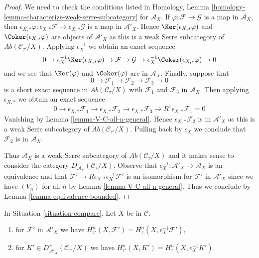 \begin{proof}
We need to check the conditions listed in
Homology, Lemma \ref{homology-lemma-characterize-weak-serre-subcategory}
for $\mathcal{A}_X$. If $\varphi : \mathcal{F} \to \mathcal{G}$ is a map
in $\mathcal{A}_X$, then $\epsilon_{X, *}\varphi :
\epsilon_{X, *}\mathcal{F} \to \epsilon_{X, *}\mathcal{G}$
is a map in $\mathcal{A}'_X$. Hence $\Ker(\epsilon_{X, *}\varphi)$ and
$\Coker(\epsilon_{X, *}\varphi)$ are objects of $\mathcal{A}'_X$
as this is a weak Serre subcategory of $\textit{Ab}(\mathcal{C}_{\tau'}/X)$.
Applying $\epsilon_X^{-1}$ we obtain an exact sequence
$$
0 \to
\epsilon_X^{-1}\Ker(\epsilon_{X, *}\varphi) \to
\mathcal{F} \to \mathcal{G} \to
\epsilon_X^{-1}\Coker(\epsilon_{X, *}\varphi) \to 0
$$
and we see that $\Ker(\varphi)$ and $\Coker(\varphi)$ are in
$\mathcal{A}_X$. Finally, suppose that
$$
0 \to \mathcal{F}_1 \to \mathcal{F}_2 \to \mathcal{F}_3 \to 0
$$
is a short exact sequence in $\textit{Ab}(\mathcal{C}_\tau/X)$
with $\mathcal{F}_1$ and $\mathcal{F}_3$ in $\mathcal{A}_X$.
Then applying $\epsilon_{X, *}$ we obtain an exact sequence
$$
0 \to 
\epsilon_{X, *}\mathcal{F}_1 \to
\epsilon_{X, *}\mathcal{F}_2 \to
\epsilon_{X, *}\mathcal{F}_3 \to
R^1\epsilon_{X, *}\mathcal{F}_1 = 0
$$
Vanishing by Lemma \ref{lemma-V-C-all-n-general}.
Hence $\epsilon_{X, *}\mathcal{F}_2$ is in $\mathcal{A}'_X$
as this is a weak Serre subcategory of $\textit{Ab}(\mathcal{C}_{\tau'}/X)$.
Pulling back by $\epsilon_X$ we conclude that
$\mathcal{F}_2$ is in $\mathcal{A}_X$.

\medskip\noindent
Thus $\mathcal{A}_X$ is a weak Serre subcategory of
$\textit{Ab}(\mathcal{C}_\tau/X)$ and it makes sense
to consider the category $D^+_{\mathcal{A}_X}(\mathcal{C}_\tau/X)$.
Observe that $\epsilon_X^{-1} : \mathcal{A}'_X \to \mathcal{A}_X$
is an equivalence and that
$\mathcal{F}' \to R\epsilon_{X, *}\epsilon_X^{-1}\mathcal{F}'$
is an isomorphism for $\mathcal{F}'$ in $\mathcal{A}'_X$ since we
have $(V_n)$ for all $n$ by Lemma \ref{lemma-V-C-all-n-general}.
Thus we conclude by Lemma \ref{lemma-equivalence-bounded}.
\end{proof}

\begin{lemma}
\label{lemma-compare-cohomology-general}
In Situation \ref{situation-compare}. Let $X$ be in $\mathcal{C}$.
\begin{enumerate}
\item for $\mathcal{F}'$ in $\mathcal{A}'_X$ we have
$H^n_{\tau'}(X, \mathcal{F}') = H^n_\tau(X, \epsilon_X^{-1}\mathcal{F}')$,
\item for $K' \in D^+_{\mathcal{A}'_X}(\mathcal{C}_{\tau'}/X)$
we have $H^n_{\tau'}(X, K') = H^n_\tau(X, \epsilon_X^{-1}K')$.
\end{enumerate}
\end{lemma}

